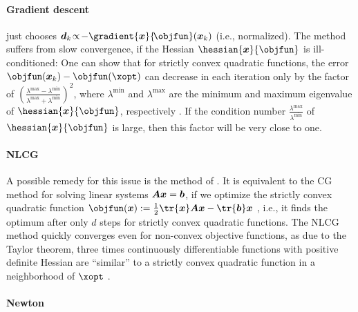 \paragraph{Gradient descent}

just chooses $\*d_k
\!\propto\! -\gradient{\*x}{\!\objfun}(\*x_k)$ (i.e., normalized).
The method suffers from slow convergence,
if the Hessian $\hessian{\*x}{\objfun}$ is ill-conditioned:
One can show that for strictly convex quadratic functions,
the error $\objfun(\*x_k) - \objfun(\xopt)$
can decrease in each iteration only by the factor of
$(\tfrac{\lambda^{\max} - \lambda^{\min}}{\lambda^{\max} + \lambda^{\min}})^2$,
where $\lambda^{\min}$ and $\lambda^{\max}$ are the minimum and maximum
eigenvalue of $\hessian{\*x}{\objfun}$, respectively
\cite{Ulbrich12Nichtlineare}.
If the condition number
$\tfrac{\lambda^{\max}}{\lambda^{\min}}$
of $\hessian{\*x}{\objfun}$ is large,
then this factor will be very close to one.

\paragraph{NLCG}

A possible remedy for this issue is the method of
.
It is equivalent to the CG method for solving \spd linear systems
${\boldsymbol{A}} {\boldsymbol{x}} = {\boldsymbol{b}}$,
if we optimize the strictly convex quadratic function
$\objfun(\*x) := \frac{1}{2} \tr{\*x} \mat{A} \*x - \tr{\*b} \*x$
, i.e.,
it finds the optimum after only $d$ steps for strictly convex
quadratic functions.
The NLCG method quickly converges even for non-convex objective functions,
as due to the Taylor theorem,
three times continuously differentiable functions
with positive definite Hessian are ``similar'' to a
strictly convex quadratic function in a neighborhood of $\xopt$
\cite{Valentin14Hierarchische}.

\paragraph{Newton}

